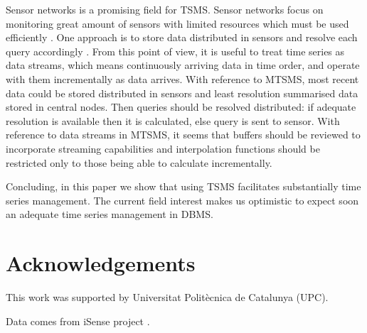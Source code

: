Sensor networks is a promising field for TSMS. Sensor networks focus
on monitoring great amount of sensors with limited resources which
must be used efficiently \cite{yaogehrke02}. One approach is to store
data distributed in sensors and resolve each query accordingly
\cite{bonnet01}. From this point of view, it is useful to treat time
series as data streams, which means continuously arriving data in time
order, and operate with them incrementally as data arrives.  With
reference to MTSMS, most recent data could be stored distributed in
sensors and least resolution summarised data stored in central
nodes. Then queries should be resolved distributed: if adequate
resolution is available then it is calculated, else query is sent to
sensor.  With reference to data streams in MTSMS, it seems that
buffers should be reviewed to incorporate streaming capabilities and
interpolation functions should be restricted only to those being able
to calculate incrementally.


Concluding, in this paper we show that using TSMS facilitates
substantially time series management. The current field interest makes
us optimistic to expect soon an adequate time series management in
DBMS.


\section*{Acknowledgements}

This work was supported by Universitat Polit\`{e}cnica de Catalunya (UPC).

Data comes from iSense project .








